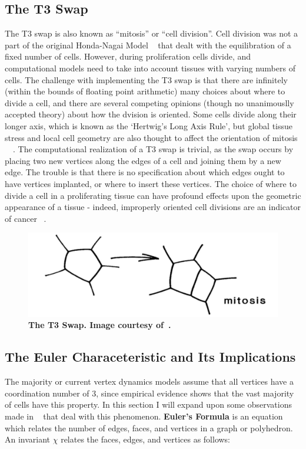 \subsection{The T3 Swap}
The T3 swap is also known as ``mitosis'' or ``cell division''. Cell division was not a part of the original Honda-Nagai Model ~\cite{HondaNagai} that dealt with the equilibration of a fixed number of cells. However, during proliferation cells divide, and computational models need to take into account tissues with varying numbers of cells. The challenge with implementing the T3 swap is that there are infinitely (within the bounds of floating point arithmetic) many choices about where to divide a cell, and there are several competing opinions (though no unanimouslly accepted theory) about how the dvision is oriented. Some cells divide along their longer axis, which is known as the `Hertwig's Long Axis Rule', but global tissue stress and local cell geometry are also thought to affect the orientation of mitosis ~\cite{Order}~\cite{Orientation}. The computational realization of a T3 swap is trivial, as the swap occurs by placing two new vertices along the edges of a cell and joining them by a new edge. The trouble is that there is no specification about which edges ought to have vertices implanted, or where to insert these vertices. The choice of where to divide a cell in a proliferating tissue can have profound effects upon the geometric appearance of a tissue - indeed, improperly oriented cell divisions are an indicator of cancer ~\cite{EpithelialTopology, misaligned}. 
\begin{figure}
\centering
\includegraphics[width=\textwidth]{../diagrams/t3.png}
\caption[The T3 Swap.]{\textbf{The T3 Swap. Image courtesy of~\cite{Soap}.}}
\label{fig:t3}
\end{figure}

\subsection{The Euler Characeteristic and Its Implications}
The majority or current vertex dynamics models assume that all vertices have a coordination number of 3, since empirical evidence shows that the vast majority of cells have this property\cite{EpithelialTopology,Overview}. In this section I will expand upon some observations made in ~\cite{Soap} that deal with this phenomenon. \textbf{Euler's Formula} is an equation which relates the number of edges, faces, and vertices in a graph or polyhedron. An invariant $\chi$ relates the faces, edges, and vertices as follows:

